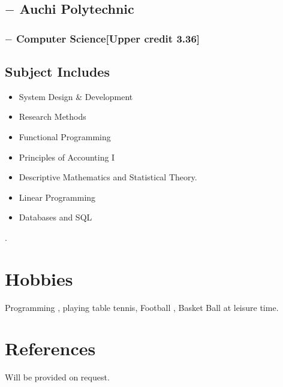 \documentclass[11px]{article}
\begin{document}


\subsection*{$-$ Auchi Polytechnic}
\subsubsection*{$-$ Computer Science[Upper credit 3.36] }
\subsection*{Subject Includes}
\begin{itemize}
	\item System Design \& Development
	\item  Research Methods
	\item Functional Programming
	\item Principles of Accounting I
	\item Descriptive Mathematics and Statistical Theory.
	\item Linear Programming
	\item Databases and SQL
\end{itemize}	
\hrulefill
.

\section{Hobbies}
Programming , playing table tennis, Football , Basket Ball  at leisure time.
\section*{References}
Will be provided on request.
\end{document}
